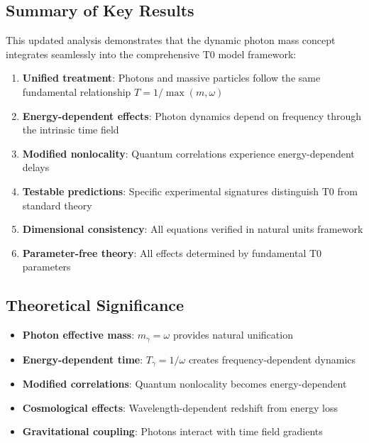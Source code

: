 \documentclass[12pt,a4paper]{article}
\begin{document}
	\subsection{Summary of Key Results}
	
	This updated analysis demonstrates that the dynamic photon mass concept integrates seamlessly into the comprehensive T0 model framework:
	
	\begin{enumerate}
		\item \textbf{Unified treatment}: Photons and massive particles follow the same fundamental relationship $T = 1/\max(m,\omega)$
		\item \textbf{Energy-dependent effects}: Photon dynamics depend on frequency through the intrinsic time field
		\item \textbf{Modified nonlocality}: Quantum correlations experience energy-dependent delays
		\item \textbf{Testable predictions}: Specific experimental signatures distinguish T0 from standard theory
		\item \textbf{Dimensional consistency}: All equations verified in natural units framework
		\item \textbf{Parameter-free theory}: All effects determined by fundamental T0 parameters
	\end{enumerate}
	
	\subsection{Theoretical Significance}
	
	\begin{tcolorbox}[colback=green!5!white,colframe=green!75!black,title=T0 Model: Dynamic Photon Mass Results]
		\begin{itemize}
			\item \textbf{Photon effective mass}: $m_\gamma = \omega$ provides natural unification
			\item \textbf{Energy-dependent time}: $T_\gamma = 1/\omega$ creates frequency-dependent dynamics
			\item \textbf{Modified correlations}: Quantum nonlocality becomes energy-dependent
			\item \textbf{Cosmological effects}: Wavelength-dependent redshift from energy loss
			\item \textbf{Gravitational coupling}: Photons interact with time field gradients
		\end{itemize}
	\end{tcolorbox}
	
\end{document}
